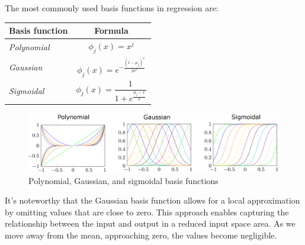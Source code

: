 The most commonly used basis functions in regression are:
\renewcommand*{\arraystretch}{2}
\begin{table}[H]
    \centering
    \begin{tabular}{|l|c|}
    \hline
    \multicolumn{1}{|c|}{\textbf{Basis function}} & \textbf{Formula}                                                                \\ \hline
    \textit{Polynomial}                           & $\phi_j(x)=x^j$                                                                 \\ \hline
    \textit{Gaussian}                             & $\phi_j(x)=e^{-\frac{{\left( x-\mu_j \right)}^2}{2 \sigma^2}}$                  \\ \hline
    \textit{Sigmoidal}                            & $\phi_j(x)=\dfrac{1}{1+e^{\frac{\mu_j-x}{\sigma}}}$                             \\ \hline
    \end{tabular}
\end{table}
\renewcommand*{\arraystretch}{1}
\begin{figure}[H]
    \centering
    \includegraphics[width=1.00\linewidth]{images/basis.png}
    \caption{Polynomial, Gaussian, and sigmoidal basis functions}
\end{figure}
It's noteworthy that the Gaussian basis function allows for a local approximation by omitting values that are close to zero.
This approach enables capturing the relationship between the input and output in a reduced input space area.
As we move away from the mean, approaching zero, the values become negligible.

